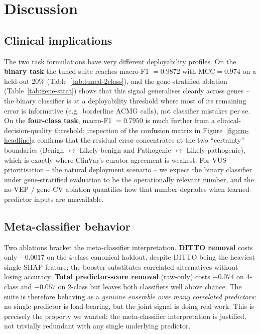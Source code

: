 \documentclass[11pt,a4paper]{article}
\begin{document}
\section{Discussion}

\subsection{Clinical implications}

The two task formulations have very different deployability profiles. On the
\textbf{binary task} the tuned suite reaches macro-F1 $=0.9872$ with
$\text{MCC}=0.974$ on a held-out 20\% (Table~\ref{tab:tuned-2class}), and the
gene-stratified ablation (Table~\ref{tab:gene-strat}) shows that this signal
generalises cleanly across genes -- the binary classifier is at a deployability
threshold where most of its remaining error is informative (e.g.\ borderline
ACMG calls), not classifier mistakes per se. On the \textbf{four-class task},
macro-F1 $=0.7950$ is much further from a clinical-decision-quality threshold;
inspection of the confusion matrix in Figure~\ref{fig:cm-headline}a confirms
that the residual error concentrates at the two ``certainty'' boundaries
(Benign $\leftrightarrow$ Likely-benign and Pathogenic $\leftrightarrow$
Likely-pathogenic), which is exactly where ClinVar's curator agreement is
weakest. For VUS prioritisation -- the natural deployment scenario -- we expect
the binary classifier under gene-stratified evaluation to be the operationally
relevant number, and the no-VEP / gene-CV ablation quantifies how that number degrades when learned-predictor
inputs are unavailable.

\subsection{Meta-classifier behavior}

Two ablations bracket the meta-classifier interpretation. \textbf{DITTO
removal} costs only $-0.0017$ on the 4-class canonical
holdout, despite DITTO being the heaviest single SHAP feature; the booster
substitutes correlated alternatives without losing accuracy.
\textbf{Total predictor-score removal} (raw-only) costs
$-0.074$ on 4-class and $-0.057$ on 2-class but leaves both classifiers well
above chance. The suite is therefore behaving as a \emph{genuine ensemble
over many correlated predictors}: no single predictor is load-bearing, but
the joint signal is doing real work. This is precisely the property we
wanted: the meta-classifier interpretation is justified, not trivially
redundant with any single underlying predictor.
\end{document}
